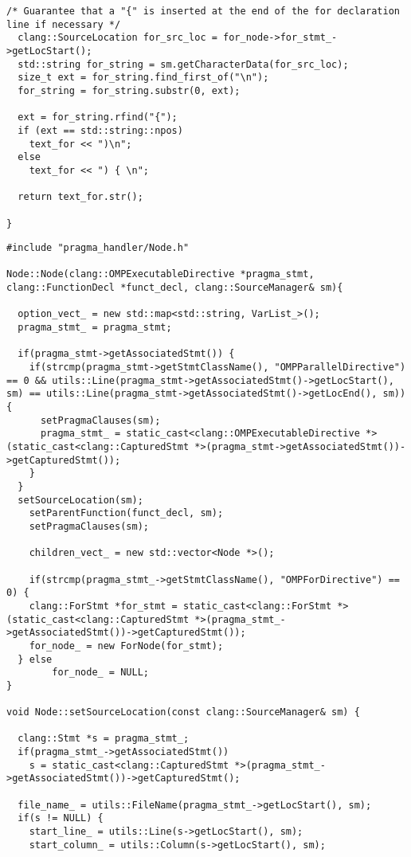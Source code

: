 \documentclass[a4paper,11pt,twoside]{book}
\begin{document}
\begin{lstlisting}[language=CCC, caption=driver/program.cpp]
  /* Guarantee that a "{" is inserted at the end of the for declaration line if necessary */ 
  clang::SourceLocation for_src_loc = for_node->for_stmt_->getLocStart();
  std::string for_string = sm.getCharacterData(for_src_loc);
  size_t ext = for_string.find_first_of("\n");
  for_string = for_string.substr(0, ext);

  ext = for_string.rfind("{");
  if (ext == std::string::npos)
    text_for << ")\n";
  else
    text_for << ") { \n";

  return text_for.str();

}
\end{lstlisting}

\begin{lstlisting}[language=CCC, caption=pragma\_handler/Node.cpp]
#include "pragma_handler/Node.h"

Node::Node(clang::OMPExecutableDirective *pragma_stmt, clang::FunctionDecl *funct_decl, clang::SourceManager& sm){
  
  option_vect_ = new std::map<std::string, VarList_>();
  pragma_stmt_ = pragma_stmt;

  if(pragma_stmt->getAssociatedStmt()) {
    if(strcmp(pragma_stmt->getStmtClassName(), "OMPParallelDirective") == 0 && utils::Line(pragma_stmt->getAssociatedStmt()->getLocStart(), sm) == utils::Line(pragma_stmt->getAssociatedStmt()->getLocEnd(), sm)){
      setPragmaClauses(sm);
      pragma_stmt_ = static_cast<clang::OMPExecutableDirective *>(static_cast<clang::CapturedStmt *>(pragma_stmt->getAssociatedStmt())->getCapturedStmt());
    }
  }
  setSourceLocation(sm);
	setParentFunction(funct_decl, sm);	
	setPragmaClauses(sm);

	children_vect_ = new std::vector<Node *>();

	if(strcmp(pragma_stmt_->getStmtClassName(), "OMPForDirective") == 0) {
    clang::ForStmt *for_stmt = static_cast<clang::ForStmt *>(static_cast<clang::CapturedStmt *>(pragma_stmt_->getAssociatedStmt())->getCapturedStmt());
    for_node_ = new ForNode(for_stmt);
  } else
		for_node_ = NULL;
}

void Node::setSourceLocation(const clang::SourceManager& sm) {
  
  clang::Stmt *s = pragma_stmt_;
  if(pragma_stmt_->getAssociatedStmt())
    s = static_cast<clang::CapturedStmt *>(pragma_stmt_->getAssociatedStmt())->getCapturedStmt();

  file_name_ = utils::FileName(pragma_stmt_->getLocStart(), sm);
  if(s != NULL) {
    start_line_ = utils::Line(s->getLocStart(), sm);
    start_column_ = utils::Column(s->getLocStart(), sm);


\end{lstlisting}
\end{document}
